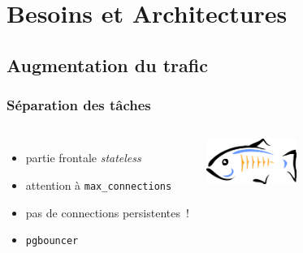 \documentclass[english]{beamer}
\begin{document}
\section{Besoins et Architectures}

\subsection{Augmentation du trafic}

\begin{frame}[fragile]
  \frametitle{Séparation des tâches}

  \linebreak
  \linebreak

\begin{columns}[c]

  \begin{itemize}
   \item<1-> partie frontale \textit{stateless}
   \item<2-> attention à \texttt{max\_connections}
   \item<2-> pas de connections persistentes !
   \item<3-> \texttt{pgbouncer}
  \end{itemize}  

\includegraphics[height=4em]{bouncer.png}
\end{columns}
\end{frame}


\end{document}
